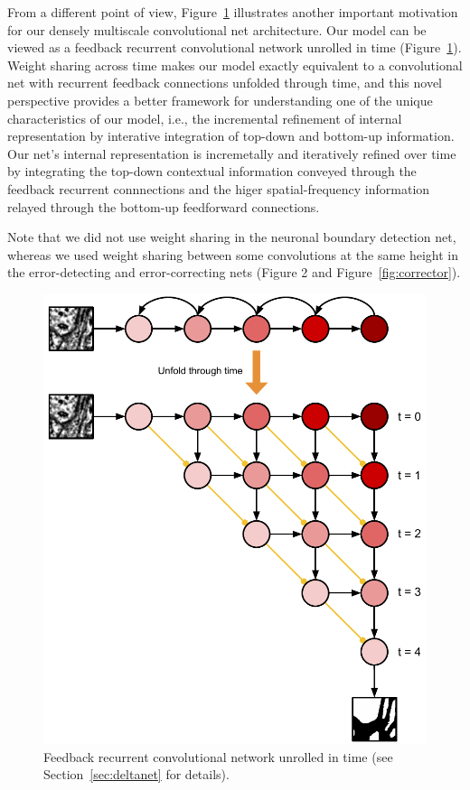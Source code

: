 \documentclass{article}
\begin{document}
From a different point of view, Figure~\ref{fig:unfold} illustrates another
important motivation for our densely multiscale convolutional net architecture.
Our model can be viewed as a feedback recurrent convolutional network unrolled
in time (Figure~\ref{fig:unfold}). Weight sharing across time makes our model
exactly equivalent to a convolutional net with recurrent feedback connections
unfolded through time, and this novel perspective provides a better framework
for understanding one of the unique characteristics of our model, i.e., the
incremental refinement of internal representation by interative integration of
top-down and bottom-up information. Our net's internal representation is
incremetally and iteratively refined over time by integrating the top-down
contextual information conveyed through the feedback recurrent connnections and
the higer spatial-frequency information relayed through the bottom-up
feedforward connections.

Note that we did not use weight sharing in the neuronal boundary detection net,
whereas we used weight sharing between some convolutions at the same height
in the error-detecting and error-correcting nets (Figure 2 and
Figure~\ref{fig:corrector}).

\begin{figure}[!t]
\centering
\includegraphics[width=0.65\linewidth]{unfold.pdf}

\caption{Feedback recurrent convolutional network unrolled in time
(see Section~\ref{sec:deltanet} for details).}

\label{fig:unfold}
\end{figure}
\end{document}
